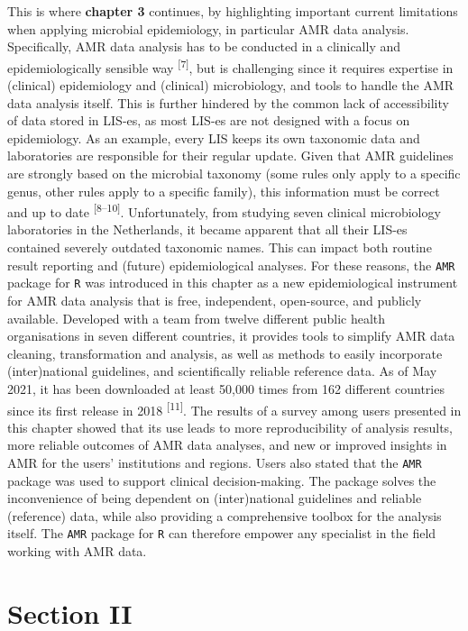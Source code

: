 \documentclass[
]{book}
\begin{document}
This is where \textbf{chapter 3} continues, by highlighting important current limitations when applying microbial epidemiology, in particular AMR data analysis. Specifically, AMR data analysis has to be conducted in a clinically and epidemiologically sensible way \textsuperscript{{[}7{]}}, but is challenging since it requires expertise in (clinical) epidemiology and (clinical) microbiology, and tools to handle the AMR data analysis itself. This is further hindered by the common lack of accessibility of data stored in LIS-es, as most LIS-es are not designed with a focus on epidemiology. As an example, every LIS keeps its own taxonomic data and laboratories are responsible for their regular update. Given that AMR guidelines are strongly based on the microbial taxonomy (some rules only apply to a specific genus, other rules apply to a specific family), this information must be correct and up to date \textsuperscript{{[}8--10{]}}. Unfortunately, from studying seven clinical microbiology laboratories in the Netherlands, it became apparent that all their LIS-es contained severely outdated taxonomic names. This can impact both routine result reporting and (future) epidemiological analyses. For these reasons, the \texttt{AMR} package for \texttt{R} was introduced in this chapter as a new epidemiological instrument for AMR data analysis that is free, independent, open-source, and publicly available. Developed with a team from twelve different public health organisations in seven different countries, it provides tools to simplify AMR data cleaning, transformation and analysis, as well as methods to easily incorporate (inter)national guidelines, and scientifically reliable reference data. As of May 2021, it has been downloaded at least 50,000 times from 162 different countries since its first release in 2018 \textsuperscript{{[}11{]}}. The results of a survey among users presented in this chapter showed that its use leads to more reproducibility of analysis results, more reliable outcomes of AMR data analyses, and new or improved insights in AMR for the users' institutions and regions. Users also stated that the \texttt{AMR} package was used to support clinical decision-making. The package solves the inconvenience of being dependent on (inter)national guidelines and reliable (reference) data, while also providing a comprehensive toolbox for the analysis itself. The \texttt{AMR} package for \texttt{R} can therefore empower any specialist in the field working with AMR data.

\hypertarget{section-ii}{%
\section*{Section II}\label{section-ii}}
\end{document}
